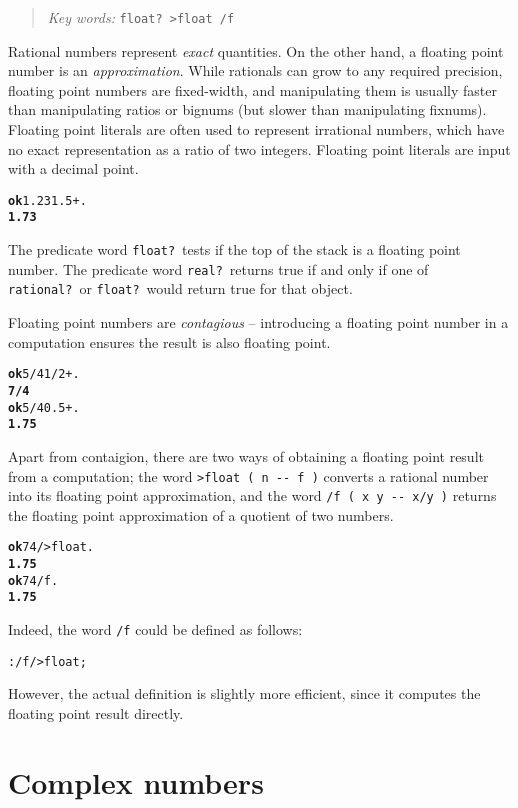 \documentclass[english]{book}
\newcommand{\chapkeywords}[1]{%
\begin{quote}
\emph{Key words:} \texttt{#1}
\end{quote}
}
\begin{document}
\chapkeywords{float?~>float /f}

Rational numbers represent \emph{exact} quantities. On the other hand, a floating point number is an \emph{approximation}. While rationals can grow to any required precision, floating point numbers are fixed-width, and manipulating them is usually faster than manipulating ratios or bignums (but slower than manipulating fixnums). Floating point literals are often used to represent irrational numbers, which have no exact representation as a ratio of two integers. Floating point literals are input with a decimal point.

\begin{alltt}
\textbf{ok} 1.23 1.5 + .
\textbf{1.73}
\end{alltt}

The predicate word \texttt{float?}~tests if the top of the stack is a floating point number. The predicate word \texttt{real?}~returns true if and only if one of \texttt{rational?}~or \texttt{float?}~would return true for that object.

Floating point numbers are \emph{contagious} -- introducing a floating point number in a computation ensures the result is also floating point.

\begin{alltt}
\textbf{ok} 5/4 1/2 + .
\textbf{7/4}
\textbf{ok} 5/4 0.5 + .
\textbf{1.75}
\end{alltt}

Apart from contaigion, there are two ways of obtaining a floating point result from a computation; the word \texttt{>float ( n -{}- f )} converts a rational number into its floating point approximation, and the word \texttt{/f ( x y -{}- x/y )} returns the floating point approximation of a quotient of two numbers.

\begin{alltt}
\textbf{ok} 7 4 / >float .
\textbf{1.75}
\textbf{ok} 7 4 /f .
\textbf{1.75}
\end{alltt}

Indeed, the word \texttt{/f} could be defined as follows:

\begin{alltt}
: /f / >float ;
\end{alltt}

However, the actual definition is slightly more efficient, since it computes the floating point result directly.

\section{Complex numbers}
\end{document}
